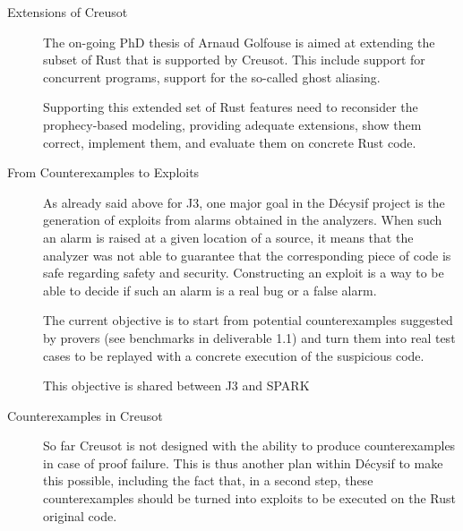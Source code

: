 \documentclass[a4paper,11pt]{article}
\begin{document}
\begin{description}
\item[Extensions of Creusot]


  The on-going PhD thesis of Arnaud Golfouse is aimed at extending the subset of
  Rust that is supported by Creusot. This include support for concurrent
  programs, support for the so-called ghost aliasing.

  Supporting this extended set of Rust features need to reconsider the
  prophecy-based modeling, providing adequate extensions, show them correct,
  implement them, and evaluate them on concrete Rust code.

\item[From Counterexamples to Exploits]


  As already said above for J3, one major goal in the Décysif project is the
  generation of exploits from alarms obtained in the analyzers. When such an
  alarm is raised at a given location of a source, it means that the analyzer
  was not able to guarantee that the corresponding piece of code is safe
  regarding safety and security. Constructing an exploit is a way to be able to
  decide if such an alarm is a real bug or a false alarm.

  The current objective is to start from potential counterexamples suggested by
  provers (see benchmarks in deliverable 1.1) and turn them into real test cases
  to be replayed with a concrete execution of the suspicious code.

  This objective is shared between J3 and SPARK

\item[Counterexamples in Creusot]


  So far Creusot is not designed with the ability to produce counterexamples in
  case of proof failure. This is thus another plan within Décysif to make this
  possible, including the fact that, in a second step, these counterexamples
  should be turned into exploits to be executed on the Rust original code.

\end{description}


%


\end{document}
